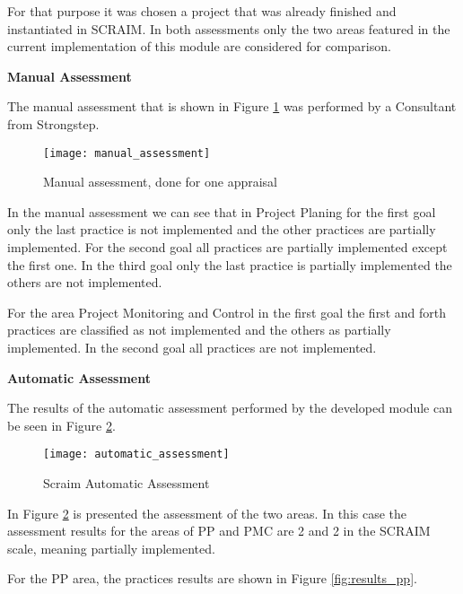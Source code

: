 For that purpose it was chosen a project that was already finished and instantiated in SCRAIM.
In both assessments only the two areas featured in the current implementation of this module are considered for comparison.
\clearpage
\newpage

\textbf{Manual Assessment}

The manual assessment that is shown in Figure \ref{fig:manual_assessment} was performed by a Consultant from Strongstep.

\begin{figure}[h]
	\begin{center}
		\leavevmode
		\texttt{[image: manual\_assessment]}
		\caption{Manual assessment, done for one appraisal}
		\label{fig:manual_assessment}
	\end{center}
\end{figure}


In the manual assessment we can see that in Project Planing for the first goal only the last practice is not implemented and the other practices are partially implemented. For the second goal all practices are partially implemented except the first one.
In the third goal only the last practice is partially implemented the others are not implemented.

For the area Project Monitoring and Control in the first goal the first and forth practices are classified as not implemented and the others as partially implemented. In the second goal all practices are not implemented.

\vspace{1cm}
\clearpage
\newpage
\textbf{Automatic Assessment}

The results of the automatic assessment performed by the developed module can be seen in Figure \ref{fig:automatic_assessment}.

\begin{figure}[h]
	\begin{center}
		\leavevmode
		\texttt{[image: automatic\_assessment]}
		\caption{Scraim Automatic Assessment}
		\label{fig:automatic_assessment}
	\end{center}
\end{figure}

In Figure \ref{fig:automatic_assessment} is presented the assessment of the two areas. In this case the assessment results for the areas of PP and PMC are 2 and 2 in the SCRAIM scale, meaning partially implemented.

For the PP area, the practices results are shown in Figure \ref{fig:results_pp}.

